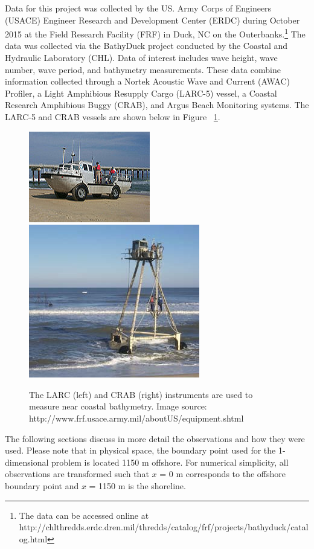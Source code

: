 Data for this project was collected by the US. Army Corps of Engineers (USACE) Engineer Research and Development Center (ERDC) during October 2015 at the Field Research Facility (FRF) in Duck, NC on the Outerbanks.\footnote{The data can be accessed online at http://chlthredds.erdc.dren.mil/thredds/catalog/frf/projects/bathyduck/catalog.html} The data was collected via the BathyDuck project conducted by the Coastal and Hydraulic Laboratory (CHL). Data of interest includes wave height, wave number, wave period, and bathymetry measurements. These data combine information collected through a Nortek Acoustic Wave and Current (AWAC) Profiler, a Light Amphibious Resupply Cargo (LARC-5) vessel, a Coastal Research Amphibious Buggy (CRAB), and Argus Beach Monitoring systems. The LARC-5 and CRAB vessels are shown below in Figure ~\ref{crablarc}.

\begin{figure}[h]
\includegraphics[width=.48\linewidth]{img/LARC.jpg}\hfill
\includegraphics[width=.48\linewidth]{img/CRAB2.JPG}
\caption{The LARC (left) and CRAB (right) instruments are used to measure near coastal bathymetry. Image source: http://www.frf.usace.army.mil/aboutUS/equipment.shtml}
\label{crablarc}
\end{figure}

The following sections discuss in more detail the observations and how they were used. Please note that in physical space, the boundary point used for the 1-dimensional problem is located 1150 m offshore. For numerical simplicity, all observations are transformed such that $\textit{x}$ = 0 m corresponds to the offshore boundary point and $\textit{x}$ = 1150 m is the shoreline. 

